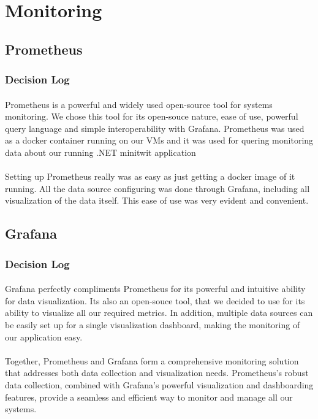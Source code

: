 \section{Monitoring}
\subsection{Prometheus}
\subsubsection{Decision Log}
\paragraph{} Prometheus is a powerful and widely used open-source tool for systems monitoring. We chose this tool for its open-souce nature, ease of use, powerful query language and simple interoperability with Grafana. Prometheus was used as a docker container running on our VMs and it was used for quering monitoring data about our running .NET minitwit application
\paragraph{} Setting up Prometheus really was as easy as just getting a docker image of it running. All the data source configuring was done through Grafana, including all visualization of the data itself. This ease of use was very evident and convenient.

\subsection{Grafana}
\subsubsection{Decision Log}
\paragraph{} Grafana perfectly compliments Prometheus for its powerful and intuitive ability for data visualization. Its also an open-souce tool, that we decided to use for its ability to visualize all our required metrics. In addition, multiple data sources can be easily set up for a single visualization dashboard, making the monitoring of our application easy.

\paragraph{} Together, Prometheus and Grafana form a comprehensive monitoring solution that addresses both data collection and visualization needs. Prometheus's robust data collection, combined with Grafana's powerful visualization and dashboarding features, provide a seamless and efficient way to monitor and manage all our systems.

